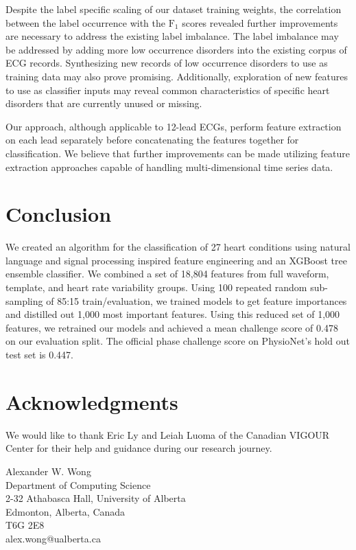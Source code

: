 \documentclass[twocolumn]{cinc}
\begin{document}
Despite the label specific scaling of our dataset training weights, the correlation between the label occurrence with the $\text{F}_1$ scores revealed further improvements are necessary to address the existing label imbalance.
The label imbalance may be addressed by adding more low occurrence disorders into the existing corpus of ECG records.
Synthesizing new records of low occurrence disorders to use as training data may also prove promising.
Additionally, exploration of new features to use as classifier inputs may reveal common characteristics of specific heart disorders that are currently unused or missing.

Our approach, although applicable to 12-lead ECGs, perform feature extraction on each lead separately before concatenating the features together for classification.
We believe that further improvements can be made utilizing feature extraction approaches capable of handling multi-dimensional time series data.

\section{Conclusion}

We created an algorithm for the classification of 27 heart conditions using natural language and signal processing inspired feature engineering and an XGBoost tree ensemble classifier.
We combined a set of 18,804 features from full waveform, template, and heart rate variability groups.
Using 100 repeated random sub-sampling of 85:15 train/evaluation, we trained models to get feature importances and distilled out 1,000 most important features.
Using this reduced set of 1,000 features, we retrained our models and achieved a mean challenge score of 0.478 on our evaluation split.
The official phase challenge score on PhysioNet's hold out test set is 0.447.


\section*{Acknowledgments}
We would like to thank Eric Ly and Leiah Luoma of the Canadian VIGOUR Center for their help and guidance during our research journey.



\begin{correspondence}
Alexander W. Wong\\
Department of Computing Science\\
2-32 Athabasca Hall, University of Alberta\\
Edmonton, Alberta, Canada\\
T6G 2E8\\
alex.wong@ualberta.ca
\end{correspondence}
\end{document}
